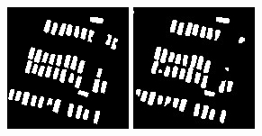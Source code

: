 \documentclass{kththesis}
\begin{document}
\begin{figure}[H]
  \includegraphics[width=\linewidth]{class_vs_w/label_1}
\endminipage\hfill
{}
  \includegraphics[width=\linewidth]{class_vs_w/un_weight_1}

\end{figure}
\end{document}
